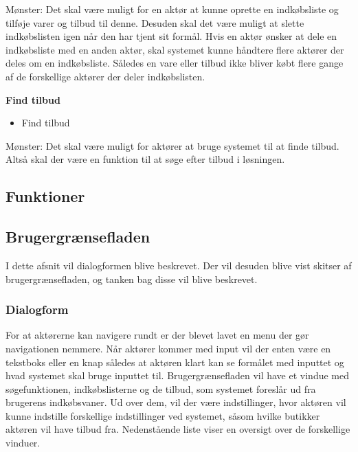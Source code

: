 Mønster: Det skal være muligt for en aktør at kunne oprette en indkøbsliste og tilføje varer og tilbud til denne. Desuden skal det være muligt at slette indkøbslisten igen når den har tjent sit formål. Hvis en aktør ønsker at dele en indkøbsliste med en anden aktør, skal systemet kunne håndtere flere aktører der deles om en indkøbsliste. Således en vare eller tilbud ikke bliver købt flere gange af de forskellige aktører der deler indkøbslisten.

\textbf{Find tilbud}

\begin{itemize}
	\item Find tilbud
\end{itemize}

Mønster: Det skal være muligt for aktører at bruge systemet til at finde tilbud. Altså skal der være en funktion til at søge efter tilbud i løsningen.

\subsection{Funktioner}


\subsection{Brugergrænsefladen}
\label{sec:brugerflade}
I dette afsnit vil dialogformen blive beskrevet. Der vil desuden blive vist skitser af brugergrænsefladen, og tanken bag disse vil blive beskrevet.
\subsubsection{Dialogform}
For at aktørerne kan navigere rundt er der blevet lavet en menu der gør navigationen nemmere. Når aktører kommer med input vil der enten være en tekstboks eller en knap således at aktøren klart kan se formålet med inputtet og hvad systemet skal bruge inputtet til.
Brugergrænsefladen vil have et vindue med søgefunktionen, indkøbslisterne og de tilbud, som systemet foreslår ud fra brugerens indkøbsvaner. Ud over dem, vil der være indstillinger, hvor aktøren vil kunne indstille forskellige indstillinger ved systemet, såsom hvilke butikker aktøren vil have tilbud fra. Nedenstående liste viser en oversigt over de forskellige vinduer.

